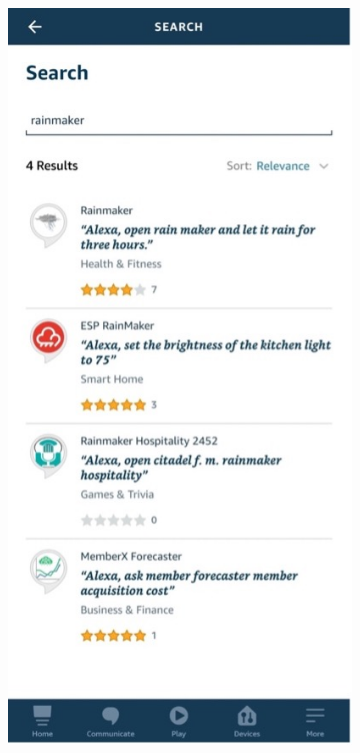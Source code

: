 \documentclass[a4paper,12pt,openany]{book}
\begin{document}
\begin{figure}[h!]
    \Centering
    \begin{subfigure}{0.4\textwidth}
        \RaggedLeft
        \includegraphics[height=1.3\textwidth,frame]{D9Z/9-14a} 
    \end{subfigure}\hspace{1em}
    \begin{subfigure}{0.4\textwidth}
        \RaggedRight

\end{subfigure}
\end{figure}
\end{document}
